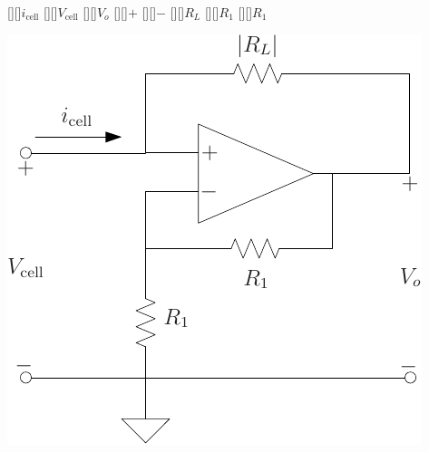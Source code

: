 [][]{$i_\text{cell}$}
[][]{$V_\text{cell}$}
[][]{$V_o$}
\psfrag{+}[][]{$+$}
\psfrag{-}[][]{$-$}
[][]{$R_L$}
[][]{$R_1$}
[][]{$R_1$}

\centering
\includegraphics[width=0.9\columnwidth]{nrc}